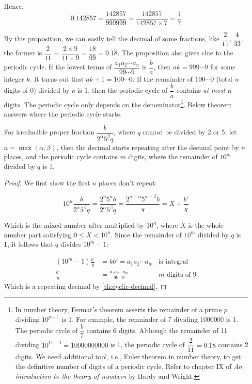 \documentclass[b5paper]{article}
\begin{document}
Hence,
\[
0.\dot{1}\dot{4}\dot{2}\dot{8}\dot{5}\dot{7} = \frac{142857}{999999} = \frac{142857}{142857 \times 7} = \frac{1}{7}
\]

By this proposition, we can easily tell the decimal of some fractions, like $\dfrac{2}{11}$, $\dfrac{4}{33}$, the former is $\dfrac{2}{11} = \dfrac{2 \times 9}{11 \times 9} = \dfrac{18}{99} = 0.\dot{1}\dot{8}$. The proposition also gives clue to the periodic cycle. If the lowest terms of $\dfrac{a_1 a_2 \cdots a_n}{99 \cdots 9}$ is $\dfrac{b}{a}$, then $ak = 999 \cdots 9$ for some integer $k$. It turns out that $ak + 1 = 100 \cdots 0$. If the remainder of $100\cdots 0$ (total $n$ digits of 0) divided by $a$ is 1, then the periodic cycle of $\dfrac{b}{a}$ contains \emph{at most} $n$ digits. The periodic cycle only depends on the denominator\footnote{In number theory, Fermat's theorem asserts the remainder of a prime $p$ dividing $10^{p-1}$ is 1. For example, the remainder of 7 dividing 1000000 is 1. The periodic cycle of $\dfrac{b}{7}$ contains 6 digits. Although the remainder of 11 dividing $10^{11-1} = 10000000000$ is 1, the periodic cycle of $\dfrac{2}{11} = 0.\dot{1}\dot{8}$ contains 2 digits. We need additional tool, i.e., Euler theorem in number theory, to get the definitive number of digits of a periodic cycle. Refer to chapter IX of \emph{An introduction to the theory of numbers} by Hardy and Wright.}. Below theorem answers where the periodic cycle starts.

\begin{theorem}\label{thm:cyclic-decimal}
For irreducible proper fraction $\dfrac{b}{2^{\alpha} 5^{\beta} q}$, where $q$ cannot be divided by 2 or 5, let $n = \max(\alpha, \beta)$, then the decimal starts repeating after the decimal point by $n$ places, and the periodic cycle contains $m$ digits, where the remainder of $10^{m}$ divided by $q$ is 1.
\end{theorem}

\begin{proof}
We first show the first $n$ places don't repeat:

\[
10^n \frac{b}{2^{\alpha} 5^{\beta} q} = \frac{2^n 5^n b}{2^{\alpha} 5^{\beta} q} = \frac{2^{n - \alpha} 5^{n - \beta} b}{q} = X + \frac{b'}{q}
\]

Which is the mixed number after multiplied by $10^n$, where $X$ is the whole number part satisfying $0 \leq X < 10^n$. Since the remainder of $10^{m}$ divided by $q$ is 1, it follows that $q$ divides $10^{m} - 1$:

\begin{align*}
  (10^{m} - 1) \frac{b'}{q} &= k b' = a_1 a_2 \cdots a_m & \text{is integral}\\
                \frac{b'}{q} &= \frac{a_1 a_2 \cdots a_m}{99\cdots9} & m\text{ digits of }9
\end{align*}
Which is a repeating decimal by \cref{th:cyclic-decimal}.
\end{proof}
\end{document}
